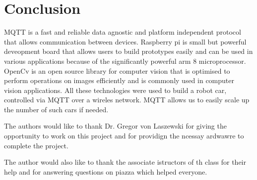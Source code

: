 \documentclass[sigconf]{acmart}
\begin{document}
\section{Conclusion}
MQTT is a fast and reliable data agnostic and platform independent protocol that allows communication between devices. Raspberry pi is small but powerful deveopment board that allows users to build prototypes easily and can be used in various applications because of the significantly powerful arm 8 microprocessor. OpenCv is an open source library for computer vision that is optimised to perform operations on images efficiently and is commonly used in computer vision applications. All these technologies were used to build a robot car, controlled via MQTT over a wireles network. MQTT allows us to easily scale up the number of such cars if needed.

\begin{acks}

  The authors would like to thank Dr. Gregor von Laszewski for giving the opportunity to work on this project and for providign the ncessay ardwawre to complete the project.
  
  The author would also like to thank the associate istructors of th class for their help and for answering questions on piazza which helped everyone.

\end{acks}


 

\appendix
\end{document}
